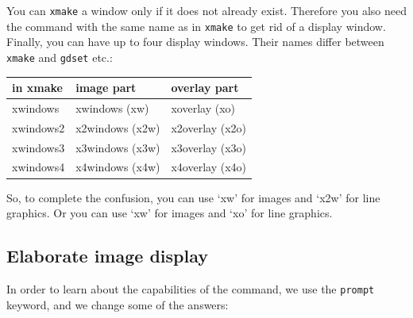 \documentclass[11pt,noabs]{starlink}
\begin{document}
   You can \texttt{xmake} a window only if it does not already exist.
   Therefore you also need the command
\texttt{}
   with the same name as in \texttt{xmake} to get rid of a display
   window. Finally, you can have up to four
   display windows. Their names differ between \texttt{xmake} and
   \texttt{gdset} etc.:




\begin{center}
\begin{tabular}{|l|l|l|}
\hline\hline
   in xmake  & image part     & overlay part\\
\hline
   xwindows  & xwindows   (xw)  & xoverlay   (xo)\\
   xwindows2 & x2windows  (x2w) & x2overlay  (x2o)\\
   xwindows3 & x3windows  (x3w) & x3overlay  (x3o)\\
   xwindows4 & x4windows  (x4w) & x4overlay  (x4o)\\
\hline\hline
\end{tabular}
\end{center}

   So, to complete the confusion, you can use `xw' for images and `x2w'
   for line graphics. Or you can use `xw' for images and `xo' for line
   graphics.


\subsection{\label{display2}Elaborate image display}

   In order to learn about the capabilities of the
\texttt{}
   command, we use the \texttt{prompt} keyword, and we change some of
   the answers:
\end{document}
